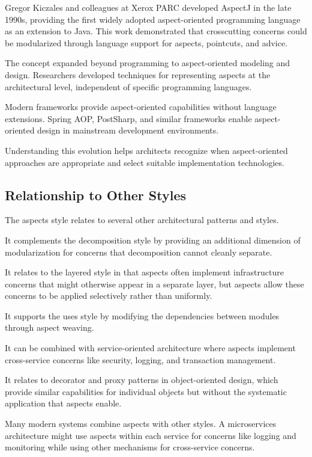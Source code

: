 \documentclass[11pt]{article}
\begin{document}
Gregor Kiczales and colleagues at Xerox PARC developed AspectJ in the late 1990s, providing the first widely adopted aspect-oriented programming language as an extension to Java. This work demonstrated that crosscutting concerns could be modularized through language support for aspects, pointcuts, and advice.

The concept expanded beyond programming to aspect-oriented modeling and design. Researchers developed techniques for representing aspects at the architectural level, independent of specific programming languages.

Modern frameworks provide aspect-oriented capabilities without language extensions. Spring AOP, PostSharp, and similar frameworks enable aspect-oriented design in mainstream development environments.

Understanding this evolution helps architects recognize when aspect-oriented approaches are appropriate and select suitable implementation technologies.

\subsection{Relationship to Other Styles}

The aspects style relates to several other architectural patterns and styles.

It complements the decomposition style by providing an additional dimension of modularization for concerns that decomposition cannot cleanly separate.

It relates to the layered style in that aspects often implement infrastructure concerns that might otherwise appear in a separate layer, but aspects allow these concerns to be applied selectively rather than uniformly.

It supports the uses style by modifying the dependencies between modules through aspect weaving.

It can be combined with service-oriented architecture where aspects implement cross-service concerns like security, logging, and transaction management.

It relates to decorator and proxy patterns in object-oriented design, which provide similar capabilities for individual objects but without the systematic application that aspects enable.

Many modern systems combine aspects with other styles. A microservices architecture might use aspects within each service for concerns like logging and monitoring while using other mechanisms for cross-service concerns.
\end{document}
